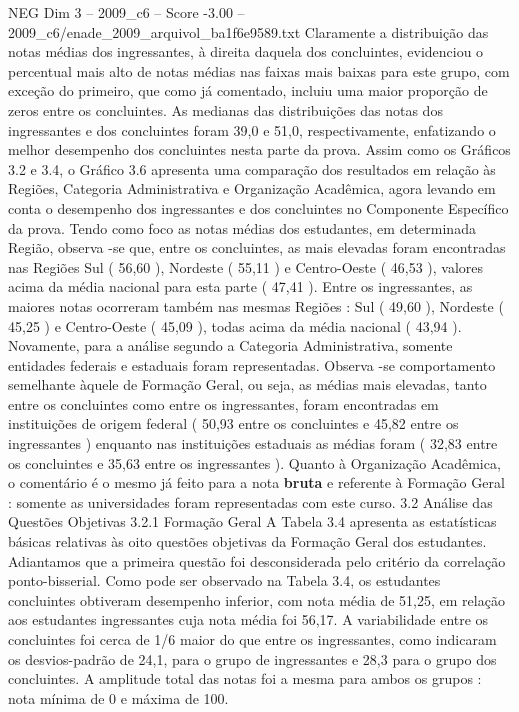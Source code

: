 \begin{textsample}{NEG Dim 3 – 2009\_c6 – Score -3.00 – 2009\_c6/enade\_2009\_arquivol\_ba1f6e9589.txt}
Claramente a distribuição das notas médias dos ingressantes, à direita daquela dos concluintes, evidenciou o percentual mais alto de notas médias nas faixas mais baixas para este grupo, com exceção do primeiro, que como já comentado, incluiu uma maior proporção de zeros entre os concluintes.
As medianas das distribuições das notas dos ingressantes e dos concluintes foram 39,0 e 51,0, respectivamente, enfatizando o melhor desempenho dos concluintes nesta parte da prova.
Assim como os Gráficos 3.2 e 3.4, o Gráfico 3.6 apresenta uma comparação dos resultados em relação às Regiões, Categoria Administrativa e Organização Acadêmica, agora levando em conta o desempenho dos ingressantes e dos concluintes no Componente Específico da prova.
Tendo como foco as notas médias dos estudantes, em determinada Região, observa -se que, entre os concluintes, as mais elevadas foram encontradas nas Regiões Sul ( 56,60 ), Nordeste ( 55,11 ) e Centro-Oeste ( 46,53 ), valores acima da média nacional para esta parte ( 47,41 ).
Entre os ingressantes, as maiores notas ocorreram também nas mesmas Regiões : Sul ( 49,60 ), Nordeste ( 45,25 ) e Centro-Oeste ( 45,09 ), todas acima da média nacional ( 43,94 ).
Novamente, para a análise segundo a Categoria Administrativa, somente entidades federais e estaduais foram representadas.
Observa -se comportamento semelhante àquele de Formação Geral, ou seja, as médias mais elevadas, tanto entre os concluintes como entre os ingressantes, foram encontradas em instituições de origem federal ( 50,93 entre os concluintes e 45,82 entre os ingressantes ) enquanto nas instituições estaduais as médias foram ( 32,83 entre os concluintes e 35,63 entre os ingressantes ).
Quanto à Organização Acadêmica, o comentário é o mesmo já feito para a nota \textbf{bruta} e referente à Formação Geral : somente as universidades foram representadas com este curso. 3.2 Análise das Questões Objetivas 3.2.1 Formação Geral A Tabela 3.4 apresenta as estatísticas básicas relativas às oito questões objetivas da Formação Geral dos estudantes.
Adiantamos que a primeira questão foi desconsiderada pelo critério da correlação ponto-bisserial.
Como pode ser observado na Tabela 3.4, os estudantes concluintes obtiveram desempenho inferior, com nota média de 51,25, em relação aos estudantes ingressantes cuja nota média foi 56,17.
A variabilidade entre os concluintes foi cerca de 1/6 maior do que entre os ingressantes, como indicaram os desvios-padrão de 24,1, para o grupo de ingressantes e 28,3 para o grupo dos concluintes.
A amplitude total das notas foi a mesma para ambos os grupos : nota mínima de 0 e máxima de 100.

\end{textsample}

